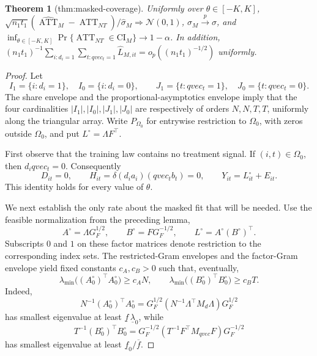 \documentclass{article}
\newtheorem{theorem}{Theorem}
\begin{document}
\begin{theorem}[thm:masked-coverage]\label{thm:masked-coverage}
Uniformly over \(\theta\in[-K,K]\), \(\sqrt{n_1t_1}(\widehat{\operatorname{ATT}}_M-\operatorname{ATT}_{NT})/\widehat\sigma_M\Rightarrow\mathcal N(0,1)\), \(\widehat\sigma_M\xrightarrow{p}\sigma\), and \(\inf_{\theta\in[-K,K]}\Pr\{\operatorname{ATT}_{NT}\in\mathrm{CI}_M\}\to1-\alpha\). In addition, \((n_1t_1)^{-1}\sum_{i:d_i=1}\sum_{t:qvec_t=1}\widehat L_{M,it}=o_p((n_1t_1)^{-1/2})\) uniformly.
\end{theorem}
\begin{proof}
Let
\[
 I_1=\{i:d_i=1\},\quad I_0=\{i:d_i=0\},\qquad
 J_1=\{t:qvec_t=1\},\quad J_0=\{t:qvec_t=0\}.
\]
The share envelope and the proportional-asymptotics envelope imply that the four cardinalities \(|I_1|,|I_0|,|J_1|,|J_0|\) are respectively of orders \(N,N,T,T\), uniformly along the triangular array.  Write \(P_{\Omega_0}\) for entrywise restriction to \(\Omega_0\), with zeros outside \(\Omega_0\), and put \(L^\circ=\Lambda F^{\top}\).

First observe that the training law contains no treatment signal.  If \((i,t)\in\Omega_0\), then \(d_iqvec_t=0\).  Consequently
\[
 D_{it}=0,\qquad
 H_{it}=\delta(d_i a_i)(qvec_t b_t)=0,\qquad
 Y_{it}=L^\circ_{it}+E_{it}.
\tag{1}
\]
This identity holds for every value of \(\theta\).

We next establish the only rate about the masked fit that will be needed.  Use the feasible normalization from the preceding lemma,
\[
 A^\circ=\Lambda G_F^{1/2},\qquad B^\circ=F G_F^{-1/2},\qquad
 L^\circ=A^\circ(B^\circ)^{\top}.
\tag{2}
\]
Subscripts \(0\) and \(1\) on these factor matrices denote restriction to the corresponding index sets.  The restricted-Gram envelopes and the factor-Gram envelope yield fixed constants \(c_A,c_B>0\) such that, eventually,
\[
 \lambda_{\min}\bigl((A^\circ_0)^{\top}A^\circ_0\bigr)
 \geq c_A N,
 \qquad
 \lambda_{\min}\bigl((B^\circ_0)^{\top}B^\circ_0\bigr)
 \geq c_B T.
\tag{3}
\]
Indeed,
\[
 N^{-1}(A^\circ_0)^{\top}A^\circ_0
 =G_F^{1/2}(N^{-1}\Lambda^{\top}M_d\Lambda)G_F^{1/2}
\]
has smallest eigenvalue at least \(\underline f\,\underline\lambda_0\), while
\[
 T^{-1}(B^\circ_0)^{\top}B^\circ_0
 =G_F^{-1/2}(T^{-1}F^{\top}M_{qvec}F)G_F^{-1/2}
\]
has smallest eigenvalue at least \(\underline f_0/\overline f\).


\end{proof}
\end{document}
